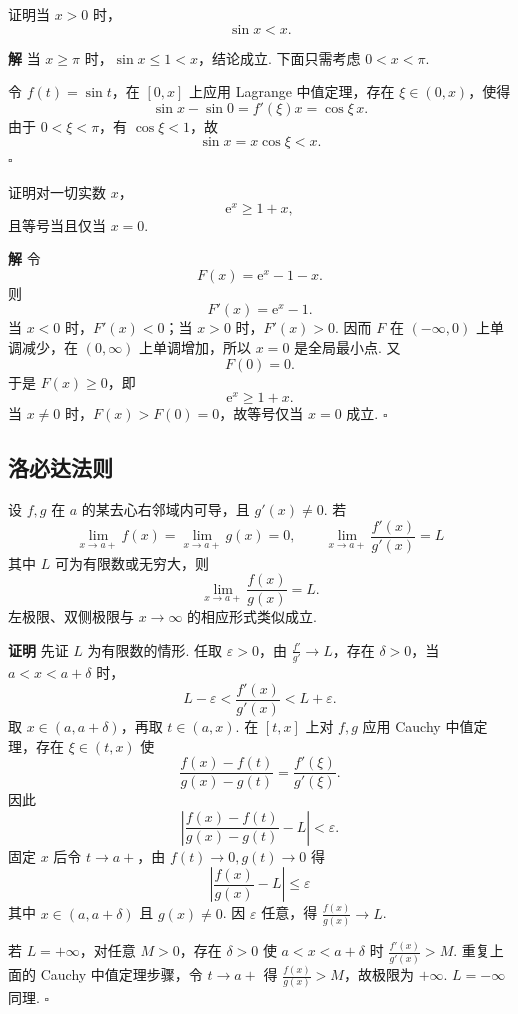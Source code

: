 \documentclass[fontset=fandol]{ctexart}
\newenvironment{proofdetail}{\par\noindent\textbf{证明}\quad}{\hfill$\square$\par\vspace{0.8em}}
\newenvironment{solution}{\par\noindent\textbf{解}\quad}{\hfill$\square$\par\vspace{0.8em}}
\newcommand{\ee}{\mathrm{e}}
\begin{document}
\begin{example}[三角函数不等式]
证明当 $x>0$ 时，
\[
\sin x<x.
\]
\end{example}
\begin{solution}
当 $x\geq\pi$ 时，$\sin x\leq1<x$，结论成立. 下面只需考虑 $0<x<\pi$.

令 $f(t)=\sin t$，在 $[0,x]$ 上应用 Lagrange 中值定理，存在 $\xi\in(0,x)$，使得
\[
\sin x-\sin0=f'(\xi)x=\cos\xi\,x.
\]
由于 $0<\xi<\pi$，有 $\cos\xi<1$，故
\[
\sin x=x\cos\xi<x.
\]
\end{solution}

\begin{example}[指数函数不等式]
证明对一切实数 $x$，
\[
\ee^x\geq1+x,
\]
且等号当且仅当 $x=0$.
\end{example}
\begin{solution}
令
\[
F(x)=\ee^x-1-x.
\]
则
\[
F'(x)=\ee^x-1.
\]
当 $x<0$ 时，$F'(x)<0$；当 $x>0$ 时，$F'(x)>0$. 因而 $F$ 在 $(-\infty,0)$ 上单调减少，在 $(0,\infty)$ 上单调增加，所以 $x=0$ 是全局最小点. 又
\[
F(0)=0.
\]
于是 $F(x)\geq0$，即
\[
\ee^x\geq1+x.
\]
当 $x\neq0$ 时，$F(x)>F(0)=0$，故等号仅当 $x=0$ 成立.
\end{solution}

\subsection{洛必达法则}

\begin{theorem}[洛必达法则：$0/0$ 型]
设 $f,g$ 在 $a$ 的某去心右邻域内可导，且 $g'(x)\neq0$. 若
\[
\lim_{x\to a+}f(x)=\lim_{x\to a+}g(x)=0,\qquad
\lim_{x\to a+}\frac{f'(x)}{g'(x)}=L
\]
其中 $L$ 可为有限数或无穷大，则
\[
\lim_{x\to a+}\frac{f(x)}{g(x)}=L.
\]
左极限、双侧极限与 $x\to\infty$ 的相应形式类似成立.
\end{theorem}
\begin{proofdetail}
先证 $L$ 为有限数的情形. 任取 $\varepsilon>0$，由 $\frac{f'}{g'}\to L$，存在 $\delta>0$，当 $a<x<a+\delta$ 时，
\[
L-\varepsilon<\frac{f'(x)}{g'(x)}<L+\varepsilon.
\]
取 $x\in(a,a+\delta)$，再取 $t\in(a,x)$. 在 $[t,x]$ 上对 $f,g$ 应用 Cauchy 中值定理，存在 $\xi\in(t,x)$ 使
\[
\frac{f(x)-f(t)}{g(x)-g(t)}=\frac{f'(\xi)}{g'(\xi)}.
\]
因此
\[
\left|\frac{f(x)-f(t)}{g(x)-g(t)}-L\right|<\varepsilon.
\]
固定 $x$ 后令 $t\to a+$，由 $f(t)\to0,g(t)\to0$ 得
\[
\left|\frac{f(x)}{g(x)}-L\right|\leq\varepsilon
\]
其中 $x\in(a,a+\delta)$ 且 $g(x)\neq0$. 因 $\varepsilon$ 任意，得 $\frac{f(x)}{g(x)}\to L$.

若 $L=+\infty$，对任意 $M>0$，存在 $\delta>0$ 使 $a<x<a+\delta$ 时 $\frac{f'(x)}{g'(x)}>M$. 重复上面的 Cauchy 中值定理步骤，令 $t\to a+$ 得 $\frac{f(x)}{g(x)}>M$，故极限为 $+\infty$. $L=-\infty$ 同理.
\end{proofdetail}
\end{document}
